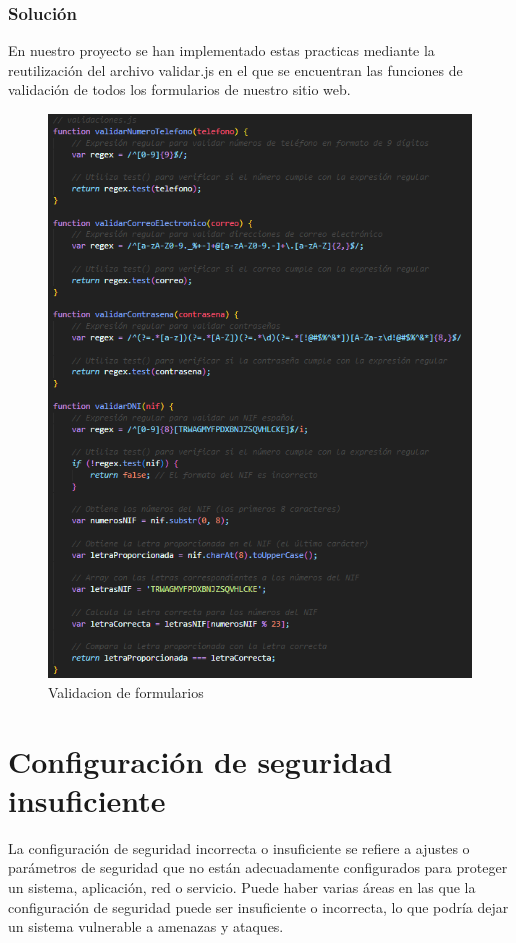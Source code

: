 \documentclass{report}
\begin{document}
                \subsubsection{Solución}
                    En nuestro proyecto se han implementado estas practicas mediante la reutilización del archivo validar.js en el que se encuentran las funciones de validación de todos los formularios de nuestro sitio web.
                    \begin{figure}[H]
                        \centering
                        \includegraphics[width=\textwidth]{./img/vulnerabilidades/3.4/1.1.png}
                        \caption{Validacion de formularios}
                    \end{figure}
            \clearpage
        \section{Configuración de seguridad insuficiente}
            La configuración de seguridad incorrecta o insuficiente se refiere a ajustes o parámetros de seguridad que no están adecuadamente configurados para proteger un sistema, aplicación, red o servicio. Puede haber varias áreas en las que la configuración de seguridad puede ser insuficiente o incorrecta, lo que podría dejar un sistema vulnerable a amenazas y ataques.
\end{document}
